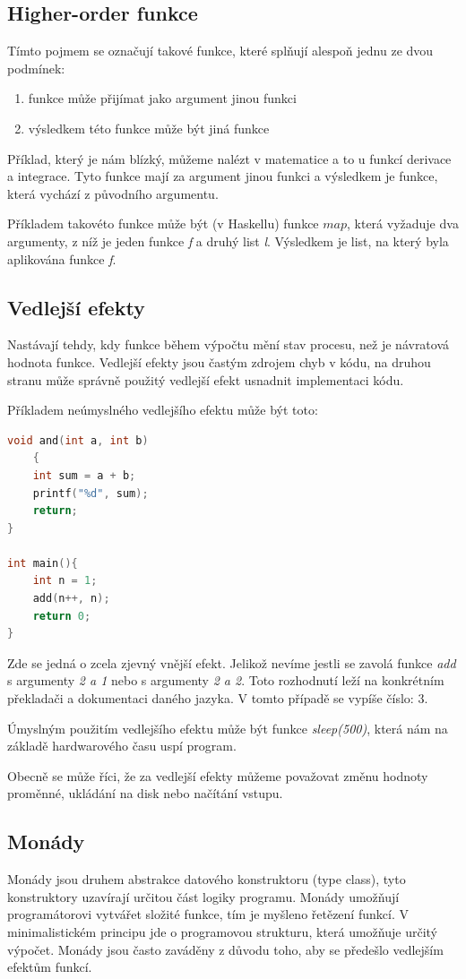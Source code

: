 \documentclass[12pt,a4paper]{report}
\begin{document}
\subsection{Higher-order funkce}
Tímto pojmem se označují takové funkce, které splňují alespoň jednu ze dvou podmínek:
\begin{enumerate}
\item funkce může přijímat jako argument jinou funkci
\item výsledkem této funkce může být jiná funkce
\end{enumerate}
Příklad, který je nám blízký, můžeme nalézt v matematice a to u funkcí derivace a integrace. Tyto funkce mají za argument jinou funkci a výsledkem je funkce, která vychází z původního argumentu.   

Příkladem takovéto funkce může být (v Haskellu) funkce $ map $, která vyžaduje dva argumenty, z níž je jeden funkce \textit{f} a druhý list \textit{l}. Výsledkem je list, na který byla aplikována funkce \textit{f}.
\newpage
\subsection{Vedlejší efekty}
Nastávají tehdy, kdy funkce během výpočtu mění stav procesu, než je návratová hodnota funkce. Vedlejší efekty jsou častým zdrojem chyb v kódu, na druhou stranu může správně použitý vedlejší efekt usnadnit implementaci kódu. 

Příkladem neúmyslného vedlejšího efektu může být toto:
\begin{lstlisting}[caption={jazyk C}, captionpos=b, language = C]	
void and(int a, int b)
	{
	int sum = a + b;	
	printf("%d", sum);	
	return;
}

int main(){
	int n = 1;
	add(n++, n);	
	return 0;
}
\end{lstlisting} 
Zde se jedná o zcela zjevný vnější efekt. Jelikož nevíme jestli se zavolá funkce \textit{add} s argumenty \textit{2 a 1} nebo s argumenty \textit{2 a 2}. Toto rozhodnutí leží na konkrétním překladači a dokumentaci daného jazyka. V tomto případě se vypíše číslo: $3$. 

Úmyslným použitím vedlejšího efektu může být funkce \textit{sleep(500)}, která nám na základě hardwarového času uspí program.

Obecně se může říci, že za vedlejší efekty můžeme považovat změnu hodnoty proměnné, ukládání na disk nebo načítání vstupu.   
\subsection{Monády}
Monády jsou druhem abstrakce datového konstruktoru (type class), tyto konstruktory uzavírají určitou část logiky programu. Monády umožňují programátorovi vytvářet složité funkce, tím je myšleno řetězení funkcí. V minimalistickém principu jde o programovou strukturu, která umožňuje určitý výpočet. Monády jsou často zaváděny z důvodu toho, aby se předešlo vedlejším efektům funkcí. 
\end{document}
